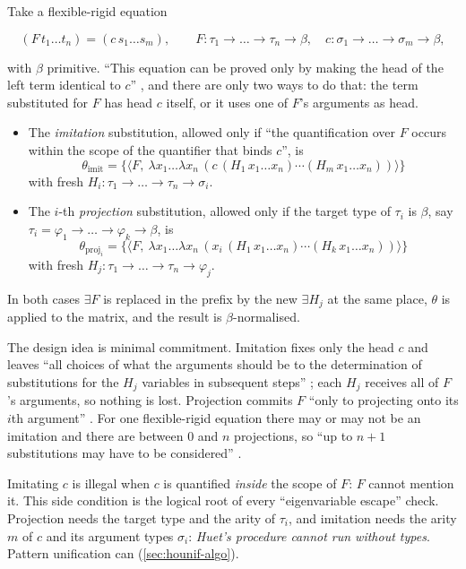 Take a flexible-rigid equation
\begin{fullwidth}
\[
  (F\,t_1\dots t_n)=(c\,s_1\dots s_m),\qquad F:\tau_1\to\dots\to\tau_n\to\beta,\quad c:\sigma_1\to\dots\to\sigma_m\to\beta,
\]
\end{fullwidth}
with $\beta$ primitive. \enquote{This equation can be proved only by making the head of the left term identical
to $c$} , and there are only two ways to do that: the term substituted for $F$ has head $c$ itself, or it
uses one of $F$'s arguments as head.

\begin{definition}\label{def:hounif-imitproj}
\leavevmode
\begin{itemize}
  \item The \emph{imitation} substitution, allowed only if \enquote{the quantification over $F$ occurs within the
    scope of the quantifier that binds $c$}, is
    \[\theta_{\mathrm{imit}}=\{\langle F,\ \lambda x_1\dots\lambda x_n\,(c\,(H_1\,x_1\dots x_n)\cdots(H_m\,x_1\dots x_n))\rangle\}\]
    with fresh $H_i:\tau_1\to\dots\to\tau_n\to\sigma_i$.
  \item The $i$-th \emph{projection} substitution, allowed only if the target type of $\tau_i$ is $\beta$, say
    $\tau_i=\varphi_1\to\dots\to\varphi_k\to\beta$, is
    \[\theta_{\mathrm{proj}_i}=\{\langle F,\ \lambda x_1\dots\lambda x_n\,(x_i\,(H_1\,x_1\dots x_n)\cdots(H_k\,x_1\dots x_n))\rangle\}\]
    with fresh $H_j:\tau_1\to\dots\to\tau_n\to\varphi_j$.
\end{itemize}
In both cases $\exists F$ is replaced in the prefix by the new $\exists H_j$ at the same place, $\theta$ is
applied to the matrix, and the result is $\beta$-normalised.
\end{definition}

The design idea is minimal commitment. Imitation fixes only the head $c$ and leaves \enquote{all choices of what
the arguments should be to the determination of substitutions for the $H_j$ variables in subsequent steps}
; each $H_j$ receives all of $F$'s arguments, so nothing is lost. Projection commits $F$ \enquote{only to
projecting onto its $i$th argument} . For one flexible-rigid equation there may or may not be an
imitation and there are between $0$ and $n$ projections, so \enquote{up to $n+1$ substitutions may have to be
considered} .

\begin{pitfall}
Imitating $c$ is illegal when $c$ is quantified \emph{inside} the scope of $F$: $F$ cannot mention it. This
side condition is the logical root of every \enquote{eigenvariable escape} check. Projection needs the target
type and the arity of $\tau_i$, and imitation needs the arity $m$ of $c$ and its argument types $\sigma_i$:
\emph{Huet's procedure cannot run without types}. Pattern unification can (\cref{sec:hounif-algo}).
\end{pitfall}

